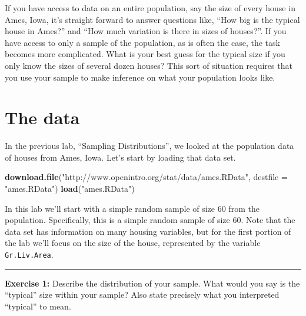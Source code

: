 \documentclass[]{book}
\newenvironment{Shaded}{\begin{snugshade}}{\end{snugshade}}
\newcommand{\KeywordTok}[1]{\textcolor[rgb]{0.13,0.29,0.53}{\textbf{#1}}}
\newcommand{\DataTypeTok}[1]{\textcolor[rgb]{0.13,0.29,0.53}{#1}}
\newcommand{\DecValTok}[1]{\textcolor[rgb]{0.00,0.00,0.81}{#1}}
\newcommand{\StringTok}[1]{\textcolor[rgb]{0.31,0.60,0.02}{#1}}
\newcommand{\OperatorTok}[1]{\textcolor[rgb]{0.81,0.36,0.00}{\textbf{#1}}}
\newcommand{\NormalTok}[1]{#1}
\theoremstyle{definition}
\theoremstyle{definition}
\theoremstyle{definition}
\theoremstyle{remark}
\begin{document}
If you have access to data on an entire population, say the size of
every house in Ames, Iowa, it's straight forward to answer questions
like, ``How big is the typical house in Ames?'' and ``How much variation
is there in sizes of houses?''. If you have access to only a sample of
the population, as is often the case, the task becomes more complicated.
What is your best guess for the typical size if you only know the sizes
of several dozen houses? This sort of situation requires that you use
your sample to make inference on what your population looks like.

\section{The data}\label{the-data-2}

In the previous lab, ``Sampling Distributions'', we looked at the
population data of houses from Ames, Iowa. Let's start by loading that
data set.

\begin{Shaded}
\begin{Highlighting}[]
\KeywordTok{download.file}\NormalTok{(}\StringTok{"http://www.openintro.org/stat/data/ames.RData"}\NormalTok{, }\DataTypeTok{destfile =} \StringTok{"ames.RData"}\NormalTok{)}
\KeywordTok{load}\NormalTok{(}\StringTok{"ames.RData"}\NormalTok{)}
\end{Highlighting}
\end{Shaded}

In this lab we'll start with a simple random sample of size 60 from the
population. Specifically, this is a simple random sample of size 60.
Note that the data set has information on many housing variables, but
for the first portion of the lab we'll focus on the size of the house,
represented by the variable \texttt{Gr.Liv.Area}.

\begin{Shaded}
\end{Shaded}

\begin{center}\rule{0.5\linewidth}{\linethickness}\end{center}

\textbf{Exercise 1:} Describe the distribution of your sample. What
would you say is the ``typical'' size within your sample? Also state
precisely what you interpreted ``typical'' to mean.
\end{document}

